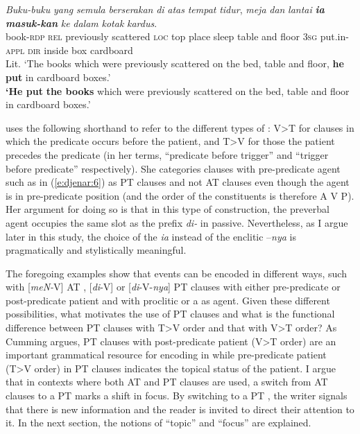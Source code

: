 \documentclass[output=paper
,modfonts
,nonflat]{langsci/langscibook}
\begin{document}
\begin{exe}
	\ex\label{e:djenar:7}
	\gll \textit{Buku-buku}   \textit{yang}   \textit{semula}   \textit{berserakan} \textit{di}  \textit{atas}  \textit{tempat}   \textit{tidur},   \textit{meja}   \textit{dan}   \textit{lantai} \textbf{\textit{ia}} {\textbf{\textit{masuk-kan}}\footnotemark} \textit{ke}   \textit{dalam}     \textit{kotak}     \textit{kardus}.\\
	book-\textsc{rdp}  \textsc{rel}  previously  scattered  \textsc{loc}  top  place  sleep  table  and  floor  \textsc{3sg}  put.in-\textsc{appl} \textsc{dir}  inside    box    cardboard \\
	Lit. ‘The books which were previously scattered on the bed, table and floor, \textbf{he put} in cardboard boxes.’\\
	\textbf{‘He put} \textbf{the books} which were previously scattered on the bed, table and floor in cardboard boxes.’ \hfill \citep[195--196]{Kurniawan2002}
\end{exe}

\noindent
\citet[34]{Cumming1991} uses the following shorthand to refer to the different types of : V>T for clauses in which the predicate occurs before the patient, and T>V for those  the patient precedes the predicate (in her terms, “predicate before trigger” and “trigger before predicate” respectively). She categories  clauses with pre-predicate agent such as in (\ref{e:djenar:6}) as PT clauses and not AT clauses even though the agent is in pre-predicate position (and the order of the constituents is therefore A V P). Her argument for doing so is that in this type of construction, the preverbal agent occupies the same slot as the prefix \textit{di-} in passive. Nevertheless, as I argue later in this study, the choice of the  \textit{ia} instead of the enclitic –\textit{nya} is pragmatically and stylistically meaningful. 

The foregoing examples show that events can be encoded in different ways, such with [\textit{meN-}V] AT , [\textit{di}-V] or [\textit{di}-V-\textit{nya}] PT clauses with either pre-predicate or post-predicate patient and   with proclitic or a  as agent. Given these different possibilities, what motivates the use of PT clauses and what is the functional difference between PT clauses with T>V order and that with V>T order? As Cumming argues, PT clauses with post-predicate patient (V>T order) are an important grammatical resource for encoding  in  while pre-predicate patient (T>V order) in PT clauses indicates the topical status of the patient. I argue that in contexts where both AT and PT clauses are used, a switch from AT clauses to a PT  marks a shift in focus. By switching to a PT , the writer signals that there is new information and the reader is invited to direct their attention to it. In the next section, the notions of “topic” and “focus” are explained.   
\end{document}
